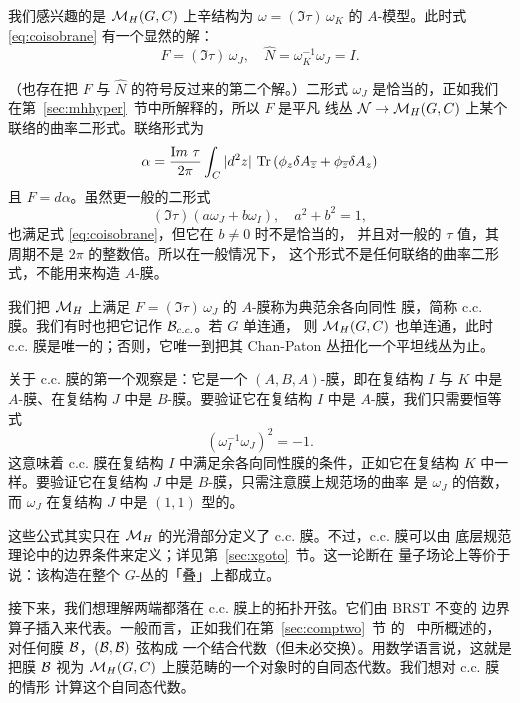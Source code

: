 我们感兴趣的是 $\MH(G,C)$ 上辛结构为 $\omega=(\Im\tau)\,\omega_K$ 的
$A$-模型。此时式 \eqref{eq:coisobrane} 有一个显然的解： %
\setcounter{equation}{1}
\begin{equation}\label{eq:yetro}
F=
(\Im\tau)\,\omega_J,\quad \hat N=\omega_K^{-1}\omega_J= I.
\end{equation}

（也存在把 $F$ 与 $\hat N$ 的符号反过来的第二个解。）二形式 $\omega_J$
是恰当的，正如我们在第~\ref{sec:mhhyper}~节中所解释的，所以 $F$ 是平凡
线丛 ${\cal N}\to\MH(G,C)$ 上某个联络的曲率二形式。联络形式为 %
\setcounter{equation}{2}
\begin{equation}\label{eq:exactcc}
\alpha={\Im\tau\over {2\pi}}\int_C |d^2z|\,
\Tr \left(\phi_z\delta A_\bz +\phi_\bz \delta A_z\right)
\end{equation}
 且 $F=d\alpha$。虽然更一般的二形式 %
\setcounter{equation}{3}
\begin{equation}\label{eq:lombo}
(\Im\tau)\left(a\omega_J+b\omega_I\right), \quad a^2+b^2=1,
\end{equation}
 也满足式 \eqref{eq:coisobrane}，但它在 $b\neq 0$ 时不是恰当的，
并且对一般的 $\tau$ 值，其周期不是 $2\pi$ 的整数倍。所以在一般情况下，
这个形式不是任何联络的曲率二形式，不能用来构造 $A$-膜。

我们把 $\MH$ 上满足 $F=(\Im\tau)\,\omega_J$ 的 $A$-膜称为典范余各向同性
膜，简称 c.c. 膜。我们有时也把它记作 ${\cal B}_{c.c.}$。若 $G$ 单连通，
则 $\MH(G,C)$ 也单连通，此时 c.c. 膜是唯一的；否则，它唯一到把其
Chan-Paton 丛扭化一个平坦线丛为止。

关于 c.c. 膜的第一个观察是：它是一个 $(A,B,A)$-膜，即在复结构 $I$ 与
$K$ 中是 $A$-膜、在复结构 $J$ 中是 $B$-膜。要验证它在复结构 $I$ 中是
$A$-膜，我们只需要恒等式
\begin{equation*}
\tag*{(11.5)}
(\omega_I^{-1}\omega_J)^2=-1.
\end{equation*}
 这意味着 c.c. 膜在复结构 $I$ 中满足余各向同性膜的条件，正如它在复结构
$K$ 中一样。要验证它在复结构 $J$ 中是 $B$-膜，只需注意膜上规范场的曲率
是 $\omega_J$ 的倍数，而 $\omega_J$ 在复结构 $J$ 中是 $(1,1)$ 型的。

这些公式其实只在 $\MH$ 的光滑部分定义了 c.c. 膜。不过，c.c. 膜可以由
底层规范理论中的边界条件来定义；详见第~\ref{sec:xgoto}~节。这一论断在
量子场论上等价于说：该构造在整个 $G$-丛的「叠」上都成立。

接下来，我们想理解两端都落在 c.c. 膜上的拓扑开弦。它们由 BRST 不变的
边界算子插入来代表。一般而言，正如我们在第~\ref{sec:comptwo}~节 的
\dunamp\ 中所概述的，对任何膜 ${\cal B}$，$({\cal B},{\cal B})$ 弦构成
一个结合代数（但未必交换）。用数学语言说，这就是把膜 ${\cal B}$ 视为
$\MH(G,C)$ 上膜范畴的一个对象时的自同态代数。我们想对 c.c. 膜的情形
计算这个自同态代数。

